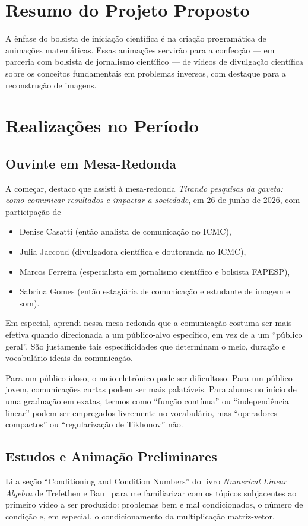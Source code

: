 \documentclass[a4paper]{article}
\begin{document}
\section*{Resumo do Projeto Proposto}
A ênfase do bolsista de iniciação científica é na criação programática de animações matemáticas.
Essas animações servirão para a confecção --- em parceria com bolsista de jornalismo científico --- de vídeos de divulgação científica sobre os conceitos fundamentais em problemas inversos, com destaque para a reconstrução de imagens.


\section*{Realizações no Período}
\subsection*{Ouvinte em Mesa-Redonda}
A começar, destaco que assisti à mesa-redonda \textit{Tirando pesquisas da gaveta: como comunicar resultados e impactar a sociedade}, em 26 de junho de 2026, com participação de
\begin{itemize}
	\item Denise Casatti (então analista de comunicação no ICMC),
	\item Julia Jaccoud (divulgadora científica e doutoranda no ICMC),
	\item Marcos Ferreira (especialista em jornalismo científico e bolsista FAPESP),
	\item Sabrina Gomes (então estagiária de comunicação e estudante de imagem e som).
\end{itemize}
Em especial, aprendi nessa mesa-redonda que a comunicação costuma ser mais efetiva quando direcionada a um público-alvo específico, em vez de a um ``público geral''. São justamente tais especificidades que determinam o meio, duração e vocabulário ideais da comunicação.

Para um público idoso, o meio eletrônico pode ser dificultoso. Para um público jovem, comunicações curtas podem ser mais palatáveis. Para alunos no início de uma graduação em exatas, termos como ``função contínua'' ou ``independência linear'' podem ser empregados livremente no vocabulário, mas ``operadores compactos'' ou ``regularização de Tikhonov'' não.

\subsection*{Estudos e Animação Preliminares}
Li a seção ``Conditioning and Condition Numbers'' do livro \textit{Numerical Linear Algebra} de Trefethen e Bau~\cite{trefethen} para me familiarizar com os tópicos subjacentes ao primeiro vídeo a ser produzido: problemas bem e mal condicionados, o número de condição e, em especial, o condicionamento da multiplicação matriz-vetor.
\end{document}
